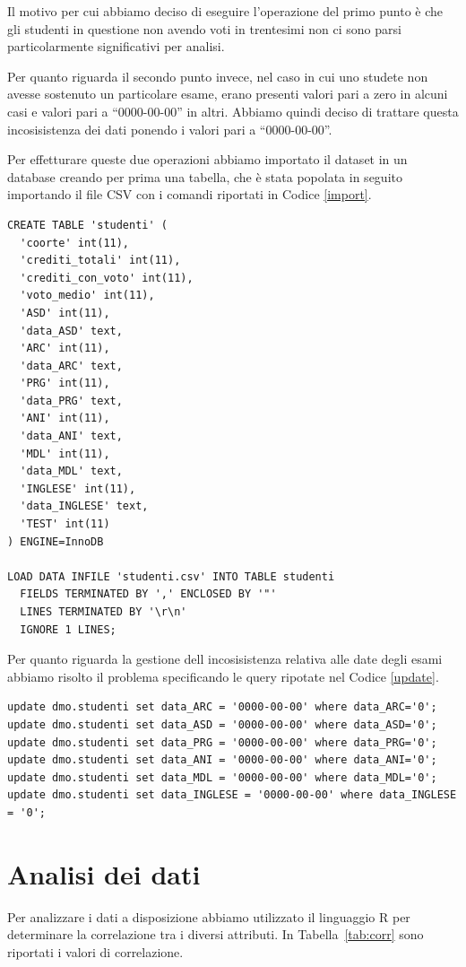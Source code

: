 \documentclass[12pt]{article}
\begin{document}
Il motivo per cui abbiamo deciso di eseguire l'operazione del primo punto è che gli studenti in questione non avendo voti in trentesimi non ci sono parsi particolarmente significativi per analisi.

Per quanto riguarda il secondo punto invece, nel caso in cui uno stu\-dete non avesse sostenuto un particolare esame, erano presenti valori pari a zero in alcuni casi e valori pari a ``0000-00-00'' in altri.
Abbiamo quindi deciso di trattare questa incosisistenza dei dati ponendo i valori pari a ``0000-00-00''.

Per effetturare queste due operazioni abbiamo importato il dataset in un database creando per prima una tabella, che è stata popolata in seguito importando il file CSV con i comandi riportati in Codice \ref{import}.
\begin{lstlisting}[caption={Creazione della table}, style=sql, label={import}, captionpos=b]
CREATE TABLE 'studenti' (
  'coorte' int(11),
  'crediti_totali' int(11),
  'crediti_con_voto' int(11),
  'voto_medio' int(11),
  'ASD' int(11),
  'data_ASD' text,
  'ARC' int(11),
  'data_ARC' text,
  'PRG' int(11),
  'data_PRG' text,
  'ANI' int(11),
  'data_ANI' text,
  'MDL' int(11),
  'data_MDL' text,
  'INGLESE' int(11),
  'data_INGLESE' text,
  'TEST' int(11)
) ENGINE=InnoDB

LOAD DATA INFILE 'studenti.csv' INTO TABLE studenti
  FIELDS TERMINATED BY ',' ENCLOSED BY '"'
  LINES TERMINATED BY '\r\n'
  IGNORE 1 LINES;
\end{lstlisting}
\newpage
Per quanto riguarda la gestione dell incosisistenza relativa alle date degli esami abbiamo risolto il problema specificando le query ripotate nel Codice \ref{update}.
\begin{lstlisting}[caption={Update della tabella},style=sql, label={update},captionpos=b]
update dmo.studenti set data_ARC = '0000-00-00' where data_ARC='0'; 
update dmo.studenti set data_ASD = '0000-00-00' where data_ASD='0'; 
update dmo.studenti set data_PRG = '0000-00-00' where data_PRG='0'; 
update dmo.studenti set data_ANI = '0000-00-00' where data_ANI='0'; 
update dmo.studenti set data_MDL = '0000-00-00' where data_MDL='0';
update dmo.studenti set data_INGLESE = '0000-00-00' where data_INGLESE = '0';
\end{lstlisting}

\section{Analisi dei dati}
Per analizzare i dati a disposizione abbiamo utilizzato il linguaggio R per determinare la correlazione tra i diversi attributi.
In Tabella~\ref{tab:corr} sono riportati i valori di correlazione.
\end{document}
